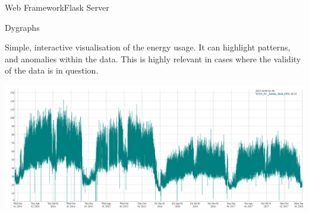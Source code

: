 \documentclass[8pt,xcolor={dvipsnames}]{beamer}
\begin{document}
{\begin{frame}{Web Framework}{Flask Server}
%

\end{frame}


\begin{frame}{Dygraphs}

Simple, interactive visualisation of the energy usage. It can highlight patterns, and anomalies within the data. This is highly relevant in cases where the validity of the data is in question.
	\begin{center}
		\includegraphics[width=\textwidth, trim=0 0 0 0, clip]{DygraphsJubilee2014_2018}
	\end{center}
\end{frame}

}
\end{document}
